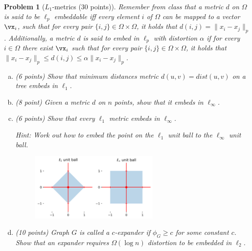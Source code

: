 \documentclass[10pt]{article}
\newcommand{\1}{\vec{\mathbbm{1}}}
\newtheorem{problem}{\sc\color{cit}Problem}
\begin{document}
\begin{problem}[$L_1$-metrics (30 points)]
Remember from class that a metric $d$ on $\Omega$ is said to be $\ell_p$ embeddable iff every element $i$ of $\Omega$ can be mapped to a vector $\vx_i$, such that for every pair $\{i, j\} \in \Omega \times \Omega$, it holds that $d(i, j) = \|x_i - x_j\|_p$. Additionally, a metric $d$ is said to embed in $\ell_p$ with distortion $\alpha$ if for every $i \in \Omega$ there exist $\vx_i$ such that for every pair $\{i, j\} \in \Omega \times \Omega$, it holds that $\|x_i - x_j\|_p \leq d(i, j) \leq \alpha \|x_i - x_j\|_p$.

\begin{enumerate}[(a)]
    \item (6 points) Show that minimum distances metric $d(u, v) = dist(u, v)$ on a tree embeds in $\ell_1$.
    
    \item (8 point) Given a metric $d$ on $n$ points, show that it embeds in $\ell_{\infty}$.

    \item (6 points) Show that every $\ell_1$ metric embeds in $\ell_{\infty}$.

    Hint: Work out how to embed the point on the $\ell_1$ unit ball to the $\ell_{\infty}$ unit ball.
    \begin{figure}[ht]
        \centering
        \includegraphics[width=0.6\textwidth]{Images/unit_balls.png}
    \end{figure}

    \item (10 points) Graph $G$ is called a $c$-expander if $\phi_G \geq c$ for some constant $c$. Show that an expander requires $\Omega(\log n)$ distortion to be embedded in $\ell_2$.
\end{enumerate}




\end{problem}
\end{document}
